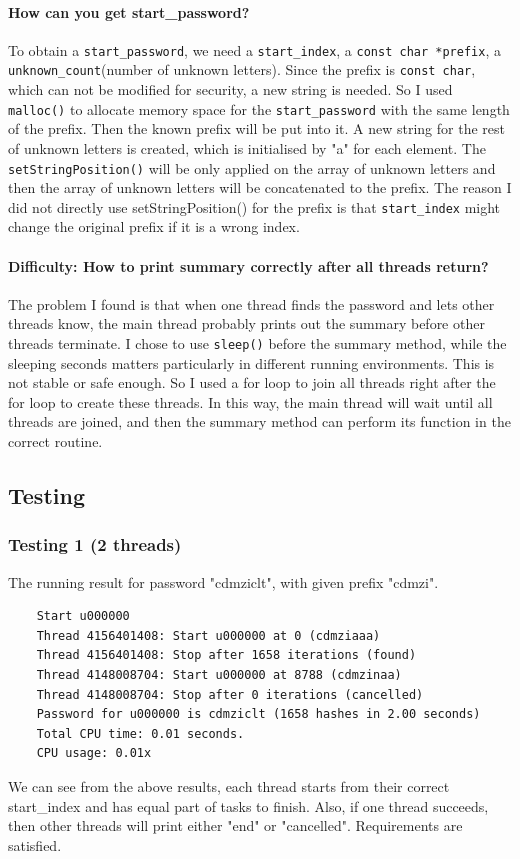 \documentclass{article}
\begin{document}
\paragraph{How can you get start\_password?}
To obtain a \texttt{start\_password}, we need a \texttt{start\_index}, a \texttt{const char *prefix}, a \texttt{unknown\_count}(number of unknown letters). Since the prefix is \texttt{const char}, which can not be modified for security, a new string is needed. So I used \texttt{malloc()} to allocate memory space for the \texttt{start\_password} with the same length of the prefix. Then the known prefix will be put into it. A new string for the rest of unknown letters is created, which is initialised by "a" for each element. The \texttt{setStringPosition()} will be only applied on the array of unknown letters and then the array of unknown letters will be concatenated to the prefix. The reason I did not directly use setStringPosition() for the prefix is that \texttt{start\_index} might change the original prefix if it is a wrong index. 

\paragraph{Difficulty: How to print summary correctly after all threads return?}
The problem I found is that when one thread finds the password and lets other threads know, the main thread probably prints out the summary before other threads terminate. I chose to use \texttt{sleep()} before the summary method, while the sleeping seconds matters particularly in different running environments. This is not stable or safe enough. So I used a for loop to join all threads right after the for loop to create these threads. In this way, the main thread will wait until all threads are joined, and then the summary method can perform its function in the correct routine.


\subsection{Testing}
\subsubsection{Testing 1 (2 threads)}
The running result for password "cdmziclt", with given prefix "cdmzi".
\begin{lstlisting}
	Start u000000
	Thread 4156401408: Start u000000 at 0 (cdmziaaa)
	Thread 4156401408: Stop after 1658 iterations (found)
	Thread 4148008704: Start u000000 at 8788 (cdmzinaa)
	Thread 4148008704: Stop after 0 iterations (cancelled)
	Password for u000000 is cdmziclt (1658 hashes in 2.00 seconds)
	Total CPU time: 0.01 seconds.
	CPU usage: 0.01x
\end{lstlisting}
We can see from the above results, each thread starts from their correct start\_index and has equal part of tasks to finish. Also, if one thread succeeds, then other threads will print either "end" or "cancelled". Requirements are satisfied. 
\end{document}
